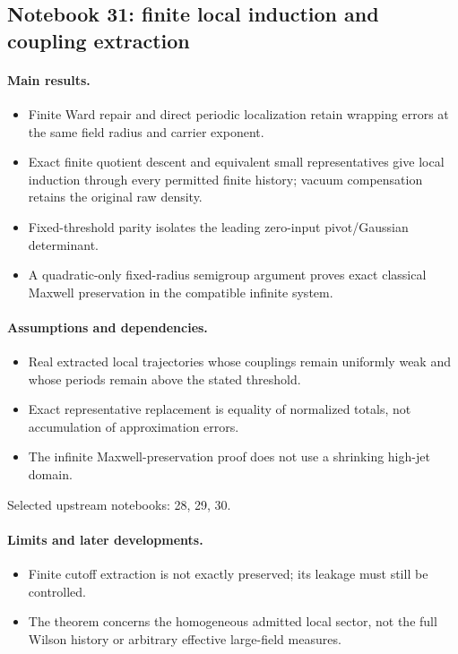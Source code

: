 \documentclass[11pt]{article}
\theoremstyle{remark}
\begin{document}
\subsection{Notebook 31: finite local induction and coupling extraction}
\label{hnc-31}
\noindent{}\par

\paragraph{Main results.}
\begin{itemize}
\item Finite Ward repair and direct periodic localization retain wrapping errors at the same field radius and carrier exponent.
\item Exact finite quotient descent and equivalent small representatives give local induction through every permitted finite history; vacuum compensation retains the original raw density.
\item Fixed-threshold parity isolates the leading zero-input pivot/Gaussian determinant.
\item A quadratic-only fixed-radius semigroup argument proves exact classical Maxwell preservation in the compatible infinite system.
\end{itemize}

\paragraph{Assumptions and dependencies.}
\begin{itemize}
\item Real extracted local trajectories whose couplings remain uniformly weak and whose periods remain above the stated threshold.
\item Exact representative replacement is equality of normalized totals, not accumulation of approximation errors.
\item The infinite Maxwell-preservation proof does not use a shrinking high-jet domain.
\end{itemize}

Selected upstream notebooks: 28, 29, 30.\par

\paragraph{Limits and later developments.}
\begin{itemize}
\item Finite cutoff extraction is not exactly preserved; its leakage must still be controlled.
\item The theorem concerns the homogeneous admitted local sector, not the full Wilson history or arbitrary effective large-field measures.
\end{itemize}
\end{document}
